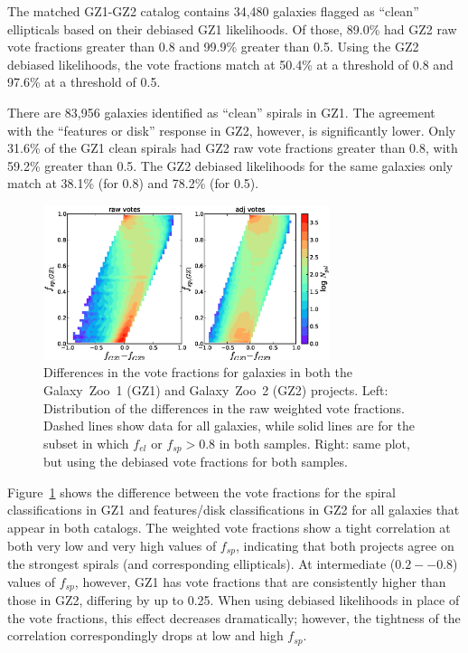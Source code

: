 \documentclass[useAMS,usenatbib]{mn2e}
\begin{document}
The matched GZ1-GZ2 catalog contains 34,480 galaxies flagged as ``clean'' ellipticals based on their debiased GZ1 likelihoods. Of those, 89.0\% had GZ2 raw vote fractions greater than 0.8 and 99.9\% greater than 0.5. Using the GZ2 debiased likelihoods, the vote fractions match at 50.4\% at a threshold of 0.8 and 97.6\% at a threshold of 0.5. 

There are 83,956 galaxies identified as ``clean'' spirals in GZ1. The agreement with the ``features or disk'' response in GZ2, however, is significantly lower. Only 31.6\% of the GZ1 clean spirals had GZ2 raw vote fractions greater than 0.8, with 59.2\% greater than 0.5. The GZ2 debiased likelihoods for the same galaxies only match at 38.1\% (for 0.8) and 78.2\% (for 0.5). 

\begin{figure}
\includegraphics[angle=0,width=3.3in]{figures/gz1_gz2_trumpet.eps}
\caption{Differences in the vote fractions for galaxies in both the Galaxy~Zoo~1 (GZ1) and Galaxy~Zoo~2 (GZ2) projects. Left: Distribution of the differences in the raw weighted vote fractions. Dashed lines show data for all galaxies, while solid lines are for the subset in which $f_{el}$ or $f_{sp} > 0.8$ in both samples. Right: same plot, but using the debiased vote fractions for both samples. 
\label{fig-trumpet}}
\end{figure}

Figure~\ref{fig-trumpet} shows the difference between the vote fractions for the spiral classifications in GZ1 and features/disk classifications in GZ2 for all galaxies that appear in both catalogs. The weighted vote fractions show a tight correlation at both very low and very high values of $f_{sp}$, indicating that both projects agree on the strongest spirals (and corresponding ellipticals). At intermediate ($0.2--0.8$) values of $f_{sp}$, however, GZ1 has vote fractions that are consistently higher than those in GZ2, differing by up to 0.25. When using debiased likelihoods in place of the vote fractions, this effect decreases dramatically; however, the tightness of the correlation correspondingly drops at low and high $f_{sp}$. 
\end{document}
